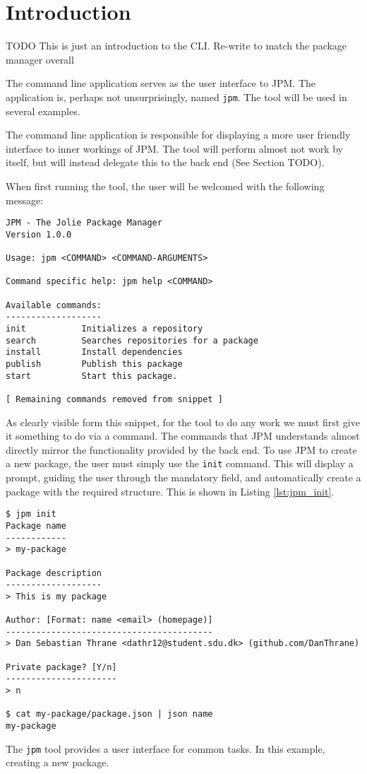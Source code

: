 \section{Introduction}

TODO This is just an introduction to the CLI. Re-write to match the package
manager overall

The command line application serves as the user interface to JPM. The
application is, perhaps not unsurprisingly, named \texttt{jpm}. The
tool will be used in several examples.

The command line application is responsible for displaying a more user friendly
interface to inner workings of JPM. The tool will perform almost not work by
itself, but will instead delegate this to the back end (See Section TODO).

When first running the tool, the user will be welcomed with the following
message:

\begin{verbatim}
JPM - The Jolie Package Manager
Version 1.0.0

Usage: jpm <COMMAND> <COMMAND-ARGUMENTS>

Command specific help: jpm help <COMMAND>

Available commands:
-------------------
init           Initializes a repository
search         Searches repositories for a package
install        Install dependencies
publish        Publish this package
start          Start this package.

[ Remaining commands removed from snippet ]
\end{verbatim}

As clearly visible form this snippet, for the tool to do any work we must first
give it something to do via a command. The commands that JPM understands almost
directly mirror the functionality provided by the back end. To use JPM to
create a new package, the user must simply use the \texttt{init}
command. This will display a prompt, guiding the user through the mandatory
field, and automatically create a package with the required structure. This
is shown in Listing \ref{lst:jpm_init}.

\begin{listing}[H]
\begin{verbatim}
$ jpm init
Package name
------------
> my-package

Package description
-------------------
> This is my package

Author: [Format: name <email> (homepage)]
-----------------------------------------
> Dan Sebastian Thrane <dathr12@student.sdu.dk> (github.com/DanThrane)

Private package? [Y/n]
----------------------
> n

$ cat my-package/package.json | json name
my-package
\end{verbatim}

\caption{The \texttt{jpm} tool provides a user interface for common
    tasks. In this example, creating a new package.}

\label{lst:jpm_init}

\end{listing}



